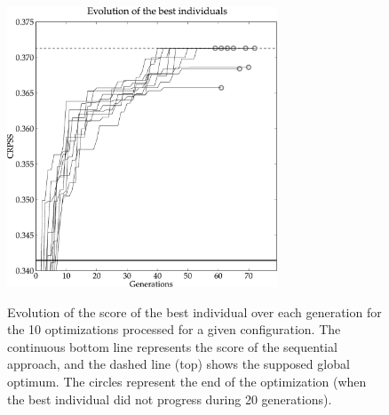 \documentclass{ametsoc}
\begin{document}
\begin{figure}[t]
	\begin{center}
		\noindent\includegraphics[width=19pc,angle=0]{fig03.pdf}\\
	\end{center}
	\caption{Evolution of the score of the best individual over each generation for the 10 optimizations processed for a given configuration. The continuous bottom line represents the score of the sequential approach, and the dashed line (top) shows the supposed global optimum. The circles represent the end of the optimization (when the best individual did not progress during 20 generations).}
	\label{fig:gas_evolution_good}
\end{figure}
\end{document}
